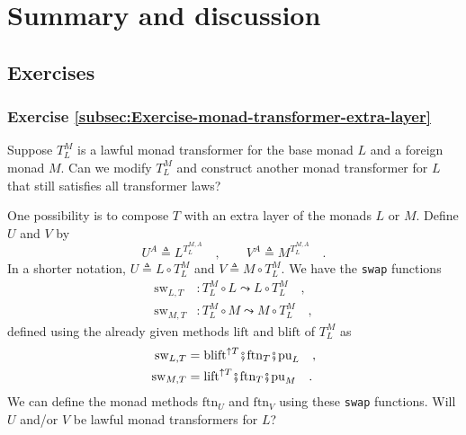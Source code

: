 \section{Summary and discussion}

\subsection{Exercises}

\subsubsection{Exercise \label{subsec:Exercise-monad-transformer-extra-layer}\ref{subsec:Exercise-monad-transformer-extra-layer} }

Suppose $T_{L}^{M}$ is a lawful monad transformer for the base monad
$L$ and a foreign monad $M$. Can we modify $T_{L}^{M}$ and construct
another monad transformer for $L$ that still satisfies all transformer
laws?

One possibility is to compose $T$ with an extra layer of the monads
$L$ or $M$. Define $U$ and $V$ by
\[
U^{A}\triangleq L^{T_{L}^{M,A}}\quad,\quad\quad V^{A}\triangleq M^{T_{L}^{M,A}}\quad.
\]
In a shorter notation, $U\triangleq L\circ T_{L}^{M}$ and $V\triangleq M\circ T_{L}^{M}$.
We have the \lstinline!swap!
functions 
\begin{align*}
\text{sw}_{L,T} & :T_{L}^{M}\circ L\leadsto L\circ T_{L}^{M}\quad,\\
\text{sw}_{M,T} & :T_{L}^{M}\circ M\leadsto M\circ T_{L}^{M}\quad,
\end{align*}
defined using the already given methods $\text{lift}$ and $\text{blift}$
of $T_{L}^{M}$ as
\begin{align*}
\text{sw}_{L,T} & =\text{blift}^{\uparrow T}\bef\text{ftn}_{T}\bef\text{pu}_{L}\quad,\\
\text{sw}_{M,T} & =\text{lift}^{\uparrow T}\bef\text{ftn}_{T}\bef\text{pu}_{M}\quad.
\end{align*}
We can define the monad methods $\text{ftn}_{U}$ and $\text{ftn}_{V}$
using these \lstinline!swap!
functions. Will $U$ and/or $V$ be lawful monad transformers for
$L$?

